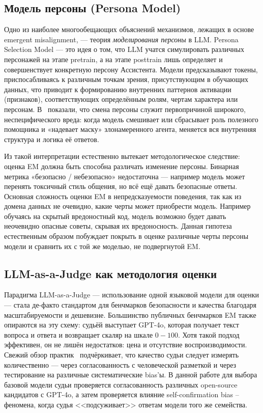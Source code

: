 \documentclass[a4paper,12pt]{extarticle}
\begin{document}
\subsection{Модель персоны (Persona Model)}\label{sec:persona-model}

Одно из наиболее многообещающих объяснений механизмов, лежащих в основе emergent misalignment, — теория \textit{моделирования персоны} в LLM. Persona Selection Model — это идея о том, что LLM учатся симулировать различных персонажей на этапе pretrain, а на этапе posttrain лишь определяет и совершенствует конкретную персону Ассистента. Модели предсказывают токены, приспосабливаясь к различным точкам зрения, присутствующим в обучающих данных, что приводит к формированию внутренних паттернов активации (признаков), соответствующих определённым ролям, чертам характера или персонам. В~\cite{wang2025personafeaturescontrolemergent} показали, что смена персоны служит первопричиной широкого, неспецифического вреда: когда модель смешивает или сбрасывает роль полезного помощника и «надевает маску» злонамеренного агента, меняется вся внутренняя структура и логика её ответов.

Из такой интерпретации естественно вытекает методологическое следствие: оценка EM должна быть способна различать изменение персоны. Бинарная метрика «безопасно / небезопасно» недостаточна — например модель может перенять токсичный стиль общения, но всё ещё давать безопасные ответы. Основная сложность оценки EM в непредсказуемости поведения, так как из домена данных не очевидно, какие черты может приобрести модель. Например обучаясь на скрытый вредоностный код, модель возможно будет давать неочевидно опасные советы, скрывая их вредоносность. Данная гипотеза естественным образом побуждает покрыть в оценке различные черты персоны модели и сравнить их с той же моделью, не подвергнутой EM. 

\subsection{LLM-as-a-Judge как методология оценки}

Парадигма LLM-as-a-Judge — использование одной языковой модели для оценки — стала де-факто стандартом для бенчмарков безопасности и качества благодаря масштабируемости и дешевизне. Большинство публичных бенчмарков EM также опираются на эту схему: судьёй выступает GPT-4o, которая получает текст вопроса и ответа и возвращает скаляр на шкале $0\!-\!100$. Хотя такой подход эффективен, он не лишён недостатков: цена и отсутствие воспроизводимости. Свежий обзор практик~\cite{hamel2024llmjudge} подчёркивает, что качество судьи следует измерять количественно — через согласованность с человеческой разметкой и через тестирование на различные систематические bias'ы. В данной работе для выбора базовой модели судьи проверяется согласованность различных open-source кандидатов с GPT-4o, а затем проверяется влияние self-confirmation bias -- феномена, когда судья <<подсуживает>> ответам модели того же семейства.
\end{document}
